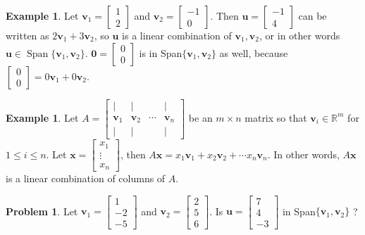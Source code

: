 \documentclass[12pt,letterpaper]{book}
\numberwithin{equation}{section}
\theoremstyle{definition}
\newtheorem{problem}[thm]{\textbf{Problem}}
\newtheorem{example}[thm]{\textbf{Example}}
\newcommand{\vu}{\bm{u}}
\newcommand{\vv}{\bm{v}}
\newcommand{\vx}{\bm{x}}
\newcommand{\veczero}{\bm{0}}
\newcommand{\Span}{\operatorname{Span}}
\begin{document}
\begin{example} Let $\vv_1=\left[\begin{array}{r} 1 \\ 2
\end{array}\right]$ and $\vv_2=\left[\begin{array}{r} -1 \\ 0
\end{array}\right]$. Then $\vu=\left[\begin{array}{r} -1 \\ 4
\end{array}\right]$ can be written as
$2\vv_1+3\vv_2$, so $\vu$ is a linear combination
of $\vv_1,\vv_2$, or in other words $\vu\in \Span\{\vv_1,\vv_2\}$. $\veczero=\left[\begin{array}{r} 0 \\ 0
\end{array}\right]$ is in Span$\{\vv_1,\vv_2\}$ as well,
because $\left[\begin{array}{r} 0 \\ 0
\end{array}\right]=0\vv_1+0\vv_2$.
\end{example}

\begin{example}\label{column theorem}
Let $A=\left[\begin{array}{cccc} | & | &   & | \\ \vv_1 & \vv_2 & \cdots & \vv_n \\ | & | &  & |
\end{array}\right]$ be an $m\times n$ matrix so that $\vv_i\in \mathbb{R}^m$ for $1\leq i \leq n$. Let $\vx=\left[\begin{array}{c} x_1 \\ \vdots
\\ x_n \end{array}\right]$, then $A\vx=x_1\vv_1+x_2\vv_2+\cdots x_n\vv_n$. In other words, $A\vx$ is a linear combination of columns of $A$.
\end{example}

\begin{problem} Let $\vv_1=\left[\begin{array}{r} 1 \\ -2 \\
-5
\end{array}\right]$ and $\vv_2=\left[\begin{array}{r} 2 \\ 5 \\ 6
\end{array}\right]$. Is $\vu=\left[\begin{array}{r} 7 \\ 4 \\ -3
\end{array}\right]$ in Span$\{\vv_1,\vv_2\}$ ?
\end{problem}
\end{document}
